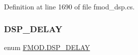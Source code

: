 Definition at line 1690 of file fmod\+\_\+dsp.\+cs.

\mbox{\label{namespace_f_m_o_d_af60a2bc05fe90a710b34bd97b4b4e504}} 
\subsubsection{\texorpdfstring{D\+S\+P\+\_\+\+D\+E\+L\+AY}{DSP\_DELAY}}
{\footnotesize\ttfamily enum \hyperlink{namespace_f_m_o_d_af60a2bc05fe90a710b34bd97b4b4e504}{F\+M\+O\+D.\+D\+S\+P\+\_\+\+D\+E\+L\+AY}\hspace{0.3cm}{\ttfamily [strong]}}

